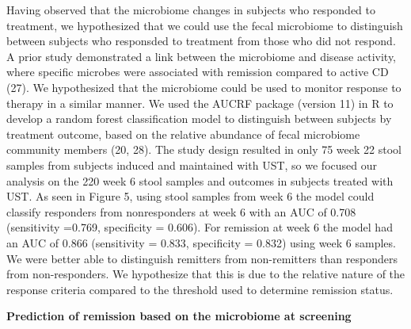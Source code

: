 \documentclass[11pt,]{article}
\begin{document}
Having observed that the microbiome changes in subjects who responded to
treatment, we hypothesized that we could use the fecal microbiome to
distinguish between subjects who responsded to treatment from those who
did not respond. A prior study demonstrated a link between the
microbiome and disease activity, where specific microbes were associated
with remission compared to active CD (27). We hypothesized that the
microbiome could be used to monitor response to therapy in a similar
manner. We used the AUCRF package (version 11) in R to develop a random
forest classification model to distinguish between subjects by treatment
outcome, based on the relative abundance of fecal microbiome community
members (20, 28). The study design resulted in only 75 week 22 stool
samples from subjects induced and maintained with UST, so we focused our
analysis on the 220 week 6 stool samples and outcomes in subjects
treated with UST. As seen in Figure 5, using stool samples from week 6
the model could classify responders from nonresponders at week 6 with an
AUC of 0.708 (sensitivity =0.769, specificity = 0.606). For remission at
week 6 the model had an AUC of 0.866 (sensitivity = 0.833, specificity =
0.832) using week 6 samples. We were better able to distinguish
remitters from non-remitters than responders from non-responders. We
hypothesize that this is due to the relative nature of the response
criteria compared to the threshold used to determine remission status.

\textbf{Prediction of remission based on the microbiome at screening}
\end{document}
